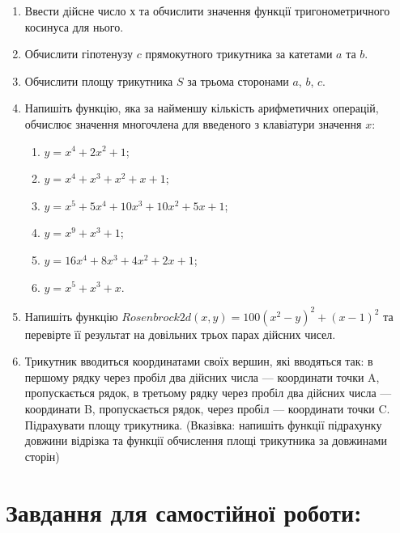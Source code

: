 \documentclass[a5paper,titlepage,openany,twoside,
]
{book_unv}%
\makeatletter
\newcommand{\xslalph}[1]{\expandafter\@xslalph\csname c@#1\endcsname}
\newcommand{\@xslalph}[1]{%
    \ifcase#1\or а\or б\or в\or г\or д\or e\or є\or ж\or з\or i%
    \or й\or к\or л\or м\or н\or о\or п\or р\or с\or т%
    \or у\or ф\or х\or ц\or ч\or ш\or ю\or я\or аа\or бб\or вв%
    \else\@ctrerr\fi%
}
\makeatother
\begin{document}
\begin{enumerate}
\def\labelenumi{\arabic{enumi})}
\item
  Ввести дійсне число х та обчислити значення функції тригонометричного
  косинуса для нього.
\item
  Обчислити гіпотенузу $c$ прямокутного трикутника за катетами
  $a$ та $b$.
\item
  Обчислити площу трикутника $S$ за трьома сторонами $a$,
  $b$, $c$.

\item
  Напишіть функцію, яка за найменшу кількість арифметичних операцій,
  обчислює значення многочлена для введеного з клавіатури значення
  $x$:
  \begin{enumerate}[label=\xslalph*)]
  \item \(y = x^{4} + 2x^{2} + 1\); 
  \item \(y = x^{4} + x^{3} + x^{2} + x + 1\);
  \item \(y = x^{5} + 5x^{4} + 10x^{3} + 10x^{2} + 5x + 1\);
  \item \(y = x^{9} + x^{3} + 1\);
  \item \(y = 16x^{4} + 8x^{3} + 4x^{2} + 2x + 1\); 
  \item \(y = x^{5} + x^{3} + x\).
  \end{enumerate}

\item
  Напишіть функцію $ Rosenbrock2d(x,y) = 100(x^{2} - y)^{2} + (x - 1)^{2}$ 
 та перевірте її результат на довільних трьох парах дійсних чисел.

\item
  Трикутник вводиться координатами своїх вершин, які вводяться так: в
  першому рядку через пробіл два дійсних числа --- координати точки A,
  пропускається рядок, в третьому рядку через пробіл два дійсних числа
  --- координати B, пропускається рядок, через пробіл --- координати
  точки C. Підрахувати площу трикутника. (Вказівка: напишіть функції
  підрахунку довжини відрізка та функції обчислення площі трикутника за
  довжинами сторін)
\end{enumerate}

\section{Завдання для самостійної роботи:}
\end{document}
